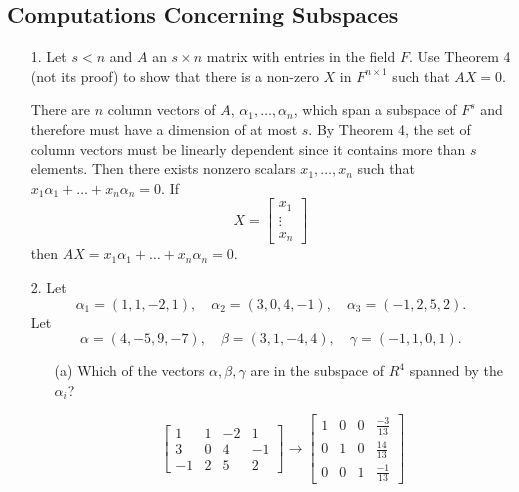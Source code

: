 \documentclass{article}
\begin{document}
\setcounter{subsection}{6}
\subsection{Computations Concerning Subspaces}

\begin{enumerate}[listparindent=\parindent]
\item[1.] Let \(s < n\) and \(A\) an \(s \times n\) matrix with entries in the field \(F\). Use Theorem 4 (not its proof)
    to show that there is a non-zero \(X\) in \(F^{n \times 1}\) such that \(AX = 0\).

    There are \(n\) column vectors of \(A\), \(\alpha_1, \dots, \alpha_n\),
    which span a subspace of \(F^s\) and therefore must have a dimension of at most \(s\).
    By Theorem 4, the set of column vectors must be linearly dependent since it contains more than \(s\) elements.
    Then there exists nonzero scalars \(x_1, \dots, x_n\) such that \(x_1\alpha_1 + \dots + x_n\alpha_n = 0\).
    If
    \[X = \begin{bmatrix} x_1 \\ \vdots \\ x_n \end{bmatrix} \]
    then \(AX = x_1\alpha_1 + \dots + x_n\alpha_n = 0\).

\item[2.] Let
    \[\alpha_1 = (1, 1, -2, 1),\quad \alpha_2 = (3, 0, 4, -1),\quad \alpha_3 = (-1, 2, 5, 2).\]
    Let
    \[\alpha = (4, -5, 9, -7),\quad \beta = (3, 1, -4, 4),\quad \gamma = (-1, 1, 0, 1).\]

    \begin{enumerate}[listparindent=\parindent]
        \item[(a)] Which of the vectors \(\alpha, \beta, \gamma\) are in the subspace of \(R^4\) spanned by the \(\alpha_i\)?

            \[
                \begin{bmatrix}
                    1 & 1 & -2 & 1 \\
                    3 & 0 & 4 & -1 \\
                    -1 & 2 & 5 & 2
                \end{bmatrix}
                \rightarrow
                \begin{bmatrix}
                    1 & 0 & 0 & \frac{-3}{13} \\
                    0 & 1 & 0 & \frac{14}{13} \\
                    0 & 0 & 1 & \frac{-1}{13}
                \end{bmatrix}
            \]


\end{enumerate}
\end{enumerate}
\end{document}

